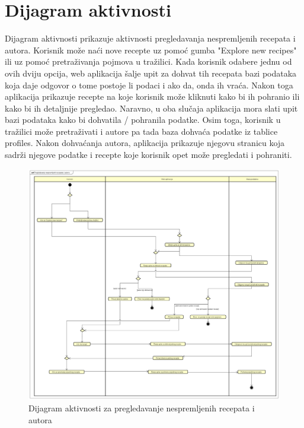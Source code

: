 		\section{Dijagram aktivnosti}
			
		\noindent Dijagram aktivnosti prikazuje aktivnosti pregledavanja nespremljenih recepata i autora. Korisnik može naći nove recepte uz pomoć gumba "Explore new recipes" ili uz pomoć pretraživanja pojmova u tražilici. Kada korisnik odabere jednu od ovih dviju opcija, web aplikacija šalje upit za dohvat tih recepata bazi podataka koja daje odgovor o tome postoje li podaci i ako da, onda ih vraća. Nakon toga aplikacija prikazuje recepte na koje korisnik može kliknuti kako bi ih pohranio ili kako bi ih detaljnije pregledao. Naravno, u oba slučaja aplikacija mora slati upit bazi podataka kako bi dohvatila / pohranila podatke. Osim toga, korisnik u tražilici može pretraživati i autore pa tada baza dohvaća podatke iz tablice profiles. Nakon dohvaćanja autora, aplikacija prikazuje njegovu stranicu koja sadrži njegove podatke i recepte koje korisnik opet može pregledati i pohraniti.   

		\eject
			
			\begin{figure}[H]
				\centering
				\includegraphics[width=1\textwidth]{slike/dijagrami/Pregledavanje nespremljenih recepata i autora_dijagram_aktivnosti.png}
				\caption{Dijagram aktivnosti za pregledavanje nespremljenih recepata i autora}
				\label{fig:enter-label}
			\end{figure}
			
